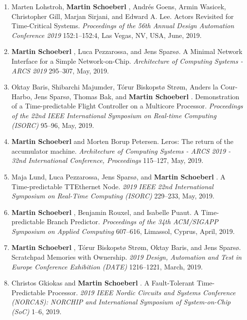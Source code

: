 \begin{enumerate}
\item Marten Lohstroh, {\bf Martin Schoeberl }, Andr{\'e}s Goens, Armin Wasicek, Christopher Gill, Marjan Sirjani, and Edward A. Lee.
 Actors Revisited for Time-Critical Systems.
 \emph{Proceedings of the 56th Annual Design Automation Conference 2019} 152:1--152:4, Las Vegas, NV, USA, June, 2019.

\item {\bf Martin Schoeberl }, Luca Pezzarossa, and Jens Spars{\o}.
 A Minimal Network Interface for a Simple Network-on-Chip.
 \emph{Architecture of Computing Systems - ARCS 2019} 295--307, May, 2019.

\item Oktay Baris, Shibarchi Majumder, T{\'o}rur Biskopst{\o} Str{\o}m, Anders la Cour-Harbo, Jens Spars{\o}, Thomas Bak, and {\bf Martin Schoeberl }.
 Demonstration of a Time-predictable Flight Controller on a Multicore Processor.
 \emph{Proceedings of the 22nd IEEE International Symposium on Real-time Computing (ISORC)} 95--96, May, 2019.

\item {\bf Martin Schoeberl } and {Morten Borup} Petersen.
 Leros: The return of the accumulator machine.
 \emph{Architecture of Computing Systems - ARCS 2019 - 32nd International Conference, Proceedings} 115--127, May, 2019.

\item Maja Lund, Luca Pezzarossa, Jens Spars{\o}, and {\bf Martin Schoeberl }.
 A Time-predictable TTEthernet Node.
 \emph{2019 IEEE 22nd International Symposium on Real-Time Computing (ISORC)} 229--233, May, 2019.

\item {\bf Martin Schoeberl }, Benjamin Rouxel, and Isabelle Puaut.
 A Time-predictable Branch Predictor.
 \emph{Proceedings of the 34th ACM/SIGAPP Symposium on Applied Computing} 607--616, Limassol, Cyprus, April, 2019.

\item {\bf Martin Schoeberl }, T{\'o}rur Biskopst{\o} Str{\o}m, Oktay Baris, and Jens Spars\o{}.
 Scratchpad Memories with Ownership.
 \emph{2019 Design, Automation and Test in Europe Conference Exhibition (DATE)} 1216--1221, March, 2019.

\item Christos Gkiokas and {\bf Martin Schoeberl }.
 A Fault-Tolerant Time-Predictable Processor.
 \emph{2019 IEEE Nordic Circuits and Systems Conference (NORCAS): NORCHIP and International Symposium of System-on-Chip (SoC)} 1--6, 2019.


\end{enumerate}
